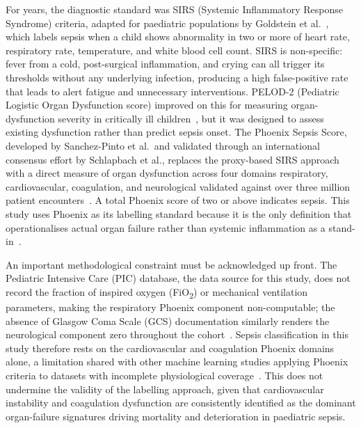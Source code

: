 \documentclass[final,3p,times]{elsarticle}
\begin{document}
For years, the diagnostic standard was SIRS (Systemic Inflammatory
Response Syndrome) criteria, adapted for paediatric populations by
Goldstein et al.~\cite{goldstein2005}, which labels sepsis when a
child shows abnormality in two or more of heart rate, respiratory
rate, temperature, and white blood cell count. SIRS is
non-specific: fever from a cold, post-surgical inflammation, and
crying can all trigger its thresholds without any underlying
infection, producing a high false-positive rate that leads to
alert fatigue and unnecessary interventions. PELOD-2 (Pediatric
Logistic Organ Dysfunction score) improved on this for measuring
organ-dysfunction severity in critically ill children~\cite{leteurtre2013},
but it was designed to assess existing dysfunction rather than
predict sepsis onset. The Phoenix Sepsis Score, developed by
Sanchez-Pinto et al.\ and validated through an international
consensus effort by Schlapbach et al., replaces the proxy-based
SIRS approach with a direct measure of organ dysfunction across
four domains  respiratory, cardiovascular, coagulation, and
neurological  validated against over three million patient
encounters~\cite{sanchezpinto2024, schlapbach2024}. A total
Phoenix score of two or above indicates sepsis. This study uses
Phoenix as its labelling standard because it is the only
definition that operationalises actual organ failure rather than
systemic inflammation as a stand-in~\cite{sanchezpinto2024}.

An important methodological constraint must be acknowledged up
front. The Pediatric Intensive Care (PIC) database, the data
source for this study, does not record the fraction of inspired
oxygen (FiO\textsubscript{2}) or mechanical ventilation parameters,
making the respiratory Phoenix component non-computable; the
absence of Glasgow Coma Scale (GCS) documentation similarly renders
the neurological component zero throughout the cohort~\cite{zeng2020}.
Sepsis classification in this study therefore rests on the
cardiovascular and coagulation Phoenix domains alone, a limitation
shared with other machine learning studies applying Phoenix
criteria to datasets with incomplete physiological coverage~\cite{chanci2025}.
This does not undermine the validity of the labelling approach,
given that cardiovascular instability and coagulation dysfunction
are consistently identified as the dominant organ-failure
signatures driving mortality and deterioration in paediatric
sepsis.
\end{document}
